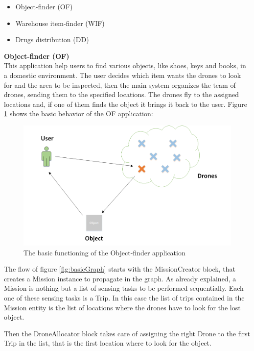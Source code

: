 \begin{itemize}
\item {Object-finder (OF)}
\item {Warehouse item-finder (WIF)}
\item {Drugs distribution (DD)}
\end{itemize}


\textbf{Object-finder (OF)}
\\

This application help users to find various objects, like shoes, keys and books, in a domestic environment.
The user decides which item wants the drones to look for and the area to be inspected, then
the main system organizes the team of drones, sending them to the specified locations.
The drones fly to the assigned locations and, if one of them finds the object it brings it back to the user.
Figure \ref{fig:OF} shows the basic behavior of the OF application:


\begin{figure}[H]
  \centering
  \includegraphics[width=\linewidth]{pictures/OF.png}
  \caption{The basic functioning of the Object-finder application}
  \label{fig:OF}
\end{figure}


The flow of figure \ref{fig:basicGraph} starts with the MissionCreator block, that creates a Mission instance to propagate in the graph.
As already explained, a Mission is nothing but a list of sensing tasks to be performed sequentially.
Each one of these sensing tasks is a Trip.
In this case the list of trips contained in the Mission entity is the list of locations where the drones have to look for the lost object.

Then the DroneAllocator block takes care of assigning the right Drone to the first Trip in the list, that is the first location where to look for the object.

